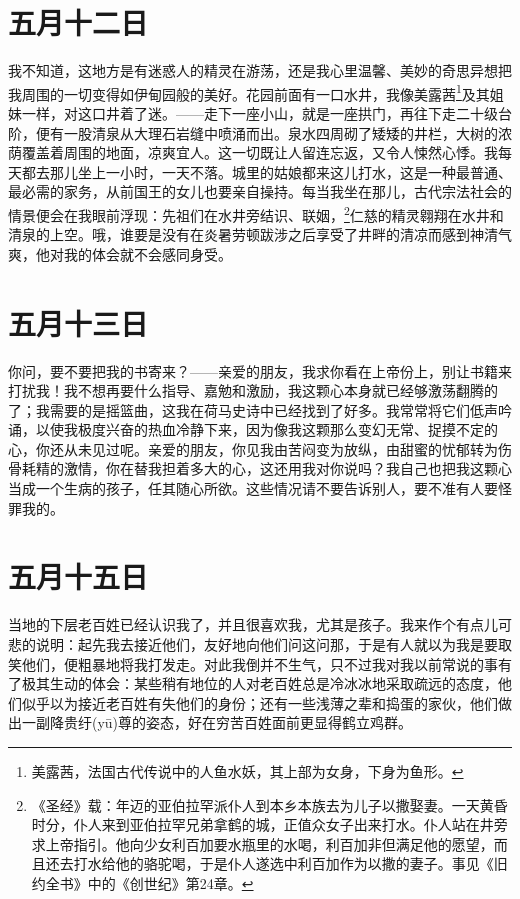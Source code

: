 \documentclass[12pt,oneside]{book}
\begin{document}
\chapter{五月十二日}
我不知道，这地方是有迷惑人的精灵在游荡，还是我心里温馨、美妙的奇思异想把我周围的一切变得如伊甸园般的美好。花园前面有一口水井，我像美露茜\footnote{美露茜，法国古代传说中的人鱼水妖，其上部为女身，下身为鱼形。}及其姐妹一样，对这口井着了迷。——走下一座小山，就是一座拱门，再往下走二十级台阶，便有一股清泉从大理石岩缝中喷涌而出。泉水四周砌了矮矮的井栏，大树的浓荫覆盖着周围的地面，凉爽宜人。这一切既让人留连忘返，又令人悚然心悸。我每天都去那儿坐上一小时，一天不落。城里的姑娘都来这儿打水，这是一种最普通、最必需的家务，从前国王的女儿也要亲自操持。每当我坐在那儿，古代宗法社会的情景便会在我眼前浮现：先祖们在水井旁结识、联姻，\footnote{《圣经》载：年迈的亚伯拉罕派仆人到本乡本族去为儿子以撒娶妻。一天黄昏时分，仆人来到亚伯拉罕兄弟拿鹤的城，正值众女子出来打水。仆人站在井旁求上帝指引。他向少女利百加要水瓶里的水喝，利百加非但满足他的愿望，而且还去打水给他的骆驼喝，于是仆人遂选中利百加作为以撒的妻子。事见《旧约全书》中的《创世纪》第24章。}仁慈的精灵翱翔在水井和清泉的上空。哦，谁要是没有在炎暑劳顿跋涉之后享受了井畔的清凉而感到神清气爽，他对我的体会就不会感同身受。


\chapter{五月十三日}
你问，要不要把我的书寄来？——亲爱的朋友，我求你看在上帝份上，别让书籍来打扰我！我不想再要什么指导、嘉勉和激励，我这颗心本身就已经够激荡翻腾的了；我需要的是摇篮曲，这我在荷马史诗中已经找到了好多。我常常将它们低声吟诵，以使我极度兴奋的热血冷静下来，因为像我这颗那么变幻无常、捉摸不定的心，你还从未见过呢。亲爱的朋友，你见我由苦闷变为放纵，由甜蜜的忧郁转为伤骨耗精的激情，你在替我担着多大的心，这还用我对你说吗？我自己也把我这颗心当成一个生病的孩子，任其随心所欲。这些情况请不要告诉别人，要不准有人要怪罪我的。
　　
\chapter{五月十五日}
当地的下层老百姓已经认识我了，并且很喜欢我，尤其是孩子。我来作个有点儿可悲的说明：起先我去接近他们，友好地向他们问这问那，于是有人就以为我是要取笑他们，便粗暴地将我打发走。对此我倒并不生气，只不过我对我以前常说的事有了极其生动的体会：某些稍有地位的人对老百姓总是冷冰冰地采取疏远的态度，他们似乎以为接近老百姓有失他们的身份；还有一些浅薄之辈和捣蛋的家伙，他们做出一副降贵纡(yū)尊的姿态，好在穷苦百姓面前更显得鹤立鸡群。
\end{document}
